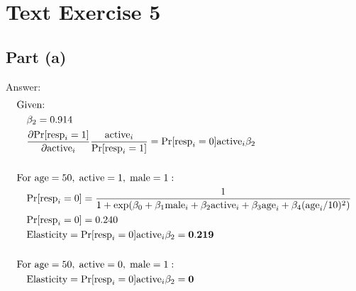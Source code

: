 \documentclass[12pt, a4paper]{article}
\begin{document}
\section*{Text Exercise 5}
\vspace{1em}
\subsection*{Part (a)}
Answer:
\begin{align*}
    &\text{Given: }\\
    &\quad\beta_2 = 0.914\\
    &\quad\frac{\partial\text{Pr}[\text{resp}_i = 1]}{\partial\text{active}_i}\frac{\text{active}_i}{\text{Pr}[\text{resp}_i = 1]} = \text{Pr}[\text{resp}_i = 0] \text{active}_i\beta_2\\\\
    &\text{For age}=50,\;\text{active}=1,\;\text{male}=1:\\
    &\quad\text{Pr}[\text{resp}_i = 0] = \frac{1}{1+\text{exp}(\beta_0 + \beta_1\text{male}_i+\beta_2\text{active}_i+\beta_3\text{age}_i+\beta_4(\text{age}_i/10)^2)}\\
    &\quad\text{Pr}[\text{resp}_i = 0] =  0.240\\
    &\quad\text{Elasticity} = \text{Pr}[\text{resp}_i = 0] \text{active}_i\beta_2 = \bf 0.219\\\\
    &\text{For age}=50,\;\text{active}=0,\;\text{male}=1:\\
    &\quad\text{Elasticity} = \text{Pr}[\text{resp}_i = 0] \text{active}_i\beta_2 = \bf 0
\end{align*}
\vspace{1em}
\end{document}
